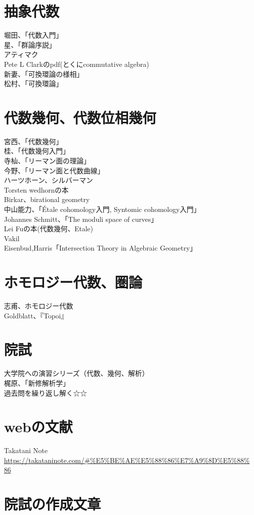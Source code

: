 \documentclass{jsarticle}
\begin{document}
\section{抽象代数}
堀田、「代数入門」\\
星、「群論序説」\\
アティマク\\
Pete L Clarkのpdf(とくにcommutative algebra)\\
新妻、「可換環論の様相」\\
松村、「可換環論」
\section{代数幾何、代数位相幾何}
宮西、「代数幾何」\\
桂、「代数幾何入門」\\
寺杣、「リーマン面の理論」\\
今野、「リーマン面と代数曲線」\\
ハーツホーン、シルバーマン\\
Torsten wedhornの本\\
Birkar、birational geometry\\
中山能力、「Étale cohomology入門, Syntomic cohomology入門」\\
Johannes Schmitt、「The moduli space of curves」\\
Lei Fuの本(代数幾何、Etale)\\
Vakil\\
Eisenbud,Harris「Intersection Theory in Algebraic Geometry」
\section{ホモロジー代数、圏論}
志甫、ホモロジー代数\\
Goldblatt、『Topoi』
\section{院試}
大学院への演習シリーズ（代数、幾何、解析）\\
梶原、「新修解析学」\\
過去問を繰り返し解く☆☆
\section{webの文献}
Takatani Note\\
\url{https://takataninote.com/#%E5%BE%AE%E5%88%86%E7%A9%8D%E5%88%86}

\newpage
\section{院試の作成文章}
\end{document}
